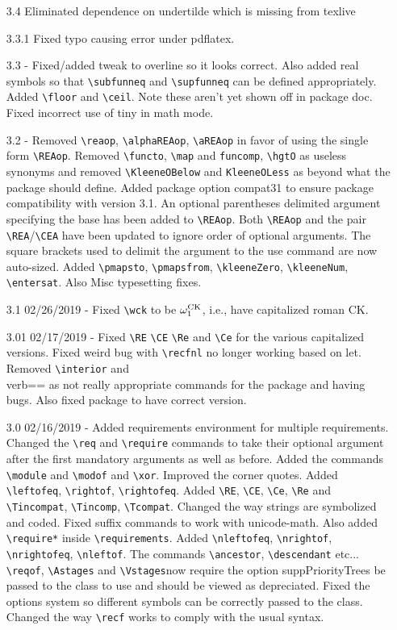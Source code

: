 \documentclass[leqno,11pt]{amsart}
\begin{document}
\begin{itemize}
	\item[3.4] Eliminated dependence on undertilde which is missing from texlive
	\item[3.3.1] Fixed typo causing error under pdflatex.
	\item[3.3]  - Fixed/added tweak to overline so it looks correct.  Also added real symbols so that \verb=\subfunneq= and \verb=\supfunneq= can be defined appropriately.  Added \verb=\floor= and \verb=\ceil=.  Note these aren't yet shown off in package doc.  Fixed incorrect use of tiny in math mode.
	\item[3.2]	- Removed \verb=\reaop=, \verb=\alphaREAop=, \verb=\aREAop= in favor of using the single form \verb=\REAop=.  Removed \verb=\functo=, \verb=\map= and \verb=funcomp=, \verb=\hgtO= as useless synonyms and removed \verb=\KleeneOBelow= and \verb=KleeneOLess= as beyond what the package should define. Added package option compat31 to ensure package compatibility with version 3.1.  An optional parentheses delimited argument specifying the base has been added to  \verb=\REAop=.  Both \verb=\REAop= and the pair \verb=\REA=/\verb=\CEA= have been updated to ignore order of optional arguments.  The square brackets used to delimit the argument to the use command are now auto-sized.  Added \verb=\pmapsto=, \verb=\pmapsfrom=, \verb=\kleeneZero=, \verb=\kleeneNum=, \verb=\entersat=.  Also Misc typesetting fixes.  
	\item[3.1]  02/26/2019 - Fixed \verb=\wck= to be \( \omega^{\mathrm{CK}}_1 \), i.e., have capitalized roman CK.
	\item[3.01] 02/17/2019 - Fixed \verb=\RE= \verb=\CE= \verb=\Re= and \verb=\Ce= for the various capitalized versions.  Fixed weird bug with \verb=\recfnl= no longer working based on let.  Removed \verb=\interior= and \\verb=\closure= as not really appropriate commands for the package and having bugs.  Also fixed package to have correct version.
	\item[3.0] 02/16/2019 - Added requirements environment for multiple requirements.  Changed the \verb=\req= and \verb=\require= commands to take their optional argument after the first mandatory arguments as well as before.  Added the commands \verb=\module= and \verb=\modof= and \verb=\xor=.  Improved the corner quotes. Added \verb=\leftofeq=, \verb=\rightof=, \verb=\rightofeq=.  Added \verb=\RE=, \verb=\CE=, \verb=\Ce=, \verb=\Re= and  \verb=\Tincompat=, \verb=\Tincomp=, \verb=\Tcompat=.  Changed the way strings are symbolized and coded.  Fixed suffix commands to work with unicode-math.  Also added \verb=\require*= inside \verb=\requirements=. Added \verb=\nleftofeq=, \verb=\nrightof=, \verb=\nrightofeq=, \verb=\nleftof=.  The commands \verb=\ancestor=, \verb=\descendant= etc... \verb=\reqof=, \verb=\Astages= and \verb=\Vstages=now require the option suppPriorityTrees be passed to the class to use and should be viewed as depreciated.  Fixed the options system so different symbols can be correctly passed to the class.    Changed the way \verb=\recf= works to comply with the usual syntax.

\end{itemize}
\end{document}
